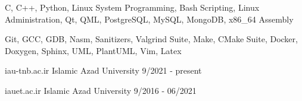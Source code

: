 \documentclass[a4paper,12pt]{memoir} %
\begin{document}
\clearpage %

\userinformation %

\framebreak %




{C, C++, Python, Linux System Programming,
Bash Scripting, Linux Administration, Qt, QML,
PostgreSQL, MySQL, MongoDB, x86\_64 Assembly}


\SmallSep %


{Git, GCC, GDB, Nasm, Sanitizers, Valgrind Suite,
Make, CMake Suite, Docker, Doxygen, Sphinx, UML,
PlantUML, Vim, Latex}


\Sep %




{iau-tnb.ac.ir}
{Islamic Azad University}
{9/2021 - present}

{iauet.ac.ir}
{Islamic Azad University}
{9/2016 - 06/2021}


\Sep %


\end{document}
